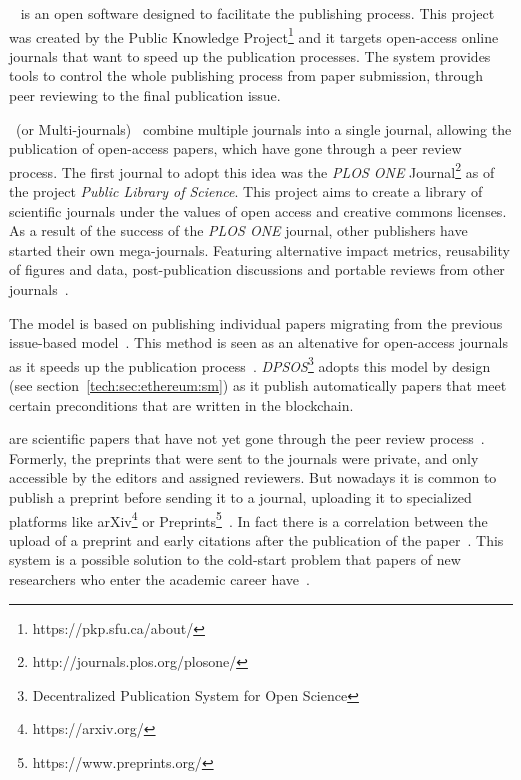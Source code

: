 ~\cite{willinsky2005open} is an open software designed
to facilitate the publishing process. This project was created by the Public
Knowledge Project\footnote{https://pkp.sfu.ca/about/} and it targets open-access
online journals that want to speed up the publication processes. The system
provides tools to control the whole publishing process from paper submission,
through peer reviewing to the final publication issue.

~(or Multi-journals)~\cite{binfield2013open,wellen2013open}
combine multiple journals into a single journal, allowing the publication of
open-access papers, which have gone through a peer review process. The first
journal to adopt this idea was the \emph{PLOS ONE}
Journal\footnote{http://journals.plos.org/plosone/} as of the project
\emph{Public Library of Science}. This project aims to create a library of
scientific journals under the values of open access and creative commons
licenses. As a result of the success of the \emph{PLOS ONE} journal, other
publishers have started their own mega-journals. Featuring alternative impact
metrics, reusability of figures and data, post-publication discussions and
portable reviews from other journals~\cite{bjork2015have}.

The  model is based on publishing individual papers
migrating from the previous issue-based model~\cite{anderton2013continuous}.
This method is seen as an altenative for open-access journals as it speeds up
the publication process~\cite{haymanview}. \emph{DPSOS}\footnote{Decentralized
  Publication System for Open Science} adopts this model by design (see
section~\ref{tech:sec:ethereum:sm}) as it publish automatically papers that meet
certain preconditions that are written in the blockchain.

 are scientific papers that have not yet gone through the peer
review process~\cite{harnad2003electronic}. Formerly, the preprints that were
sent to the journals were private, and only accessible by the editors and
assigned reviewers. But nowadays it is common to publish a preprint before
sending it to a journal, uploading it to specialized platforms like
arXiv\footnote{https://arxiv.org/} or
Preprints\footnote{https://www.preprints.org/}~\cite{brown2001volution}. In fact
there is a correlation between the upload of a preprint and early citations
after the publication of the paper~\cite{shuai2012scientific}. This system is a
possible solution to the cold-start problem that papers of new researchers who
enter the academic career have~\cite{sugiyama2010scholarly}.

